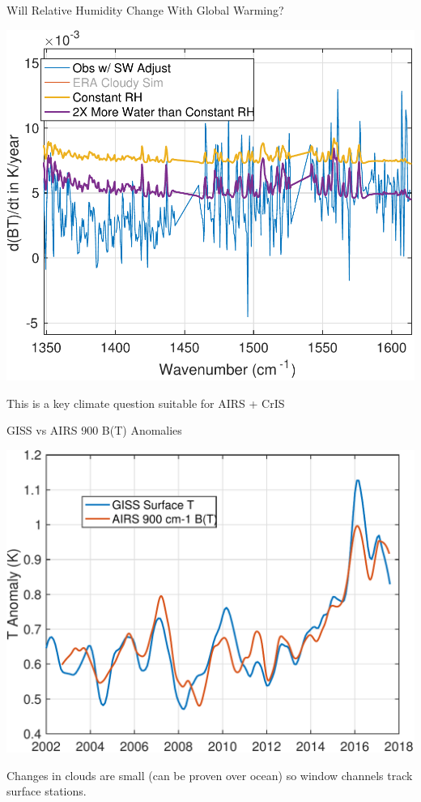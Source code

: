 \documentclass[10pt,t]{beamer}
\begin{document}
\begin{frame}[label={sec:org77b2448}]{Will Relative Humidity Change With Global Warming?}
\vspace{-0.1in}
\begin{center}
\includegraphics[width=0.8\linewidth]{./Figs/Pdf/global_dbt_l1c_minus_greenhouse_gases_swadjust_vs_era_water_RH_noera.pdf}
\end{center}
\vspace{-0.1in}
\small
This is a key climate question suitable for AIRS + CrIS
\end{frame}

\begin{frame}[label={sec:org5e53653}]{GISS vs AIRS 900 \wn B(T) Anomalies}
\vspace{-0.1in}
\begin{center}
\includegraphics[width=0.8\linewidth]{./Figs/Pdf/giss_sfct_vs_airs_900cmbt.pdf}
\end{center}
\vspace{-0.05in}
\small
Changes in clouds are small (can be proven over ocean) so window channels track surface stations.  
\end{frame}
\end{document}
